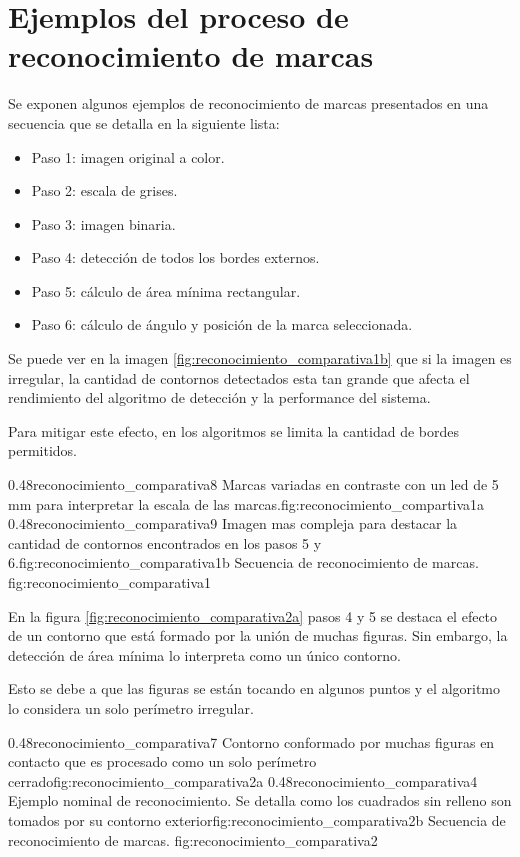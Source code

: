 
\chapter{Ejemplos del proceso de reconocimiento de marcas} %
\label{AppendixA} %

         Se exponen algunos ejemplos de reconocimiento de marcas presentados en una secuencia que se detalla en la siguiente lista:
         \begin{itemize}
            \item{Paso 1: imagen original a color.}
            \item{Paso 2: escala de grises.}
            \item{Paso 3: imagen binaria.}
            \item{Paso 4: detección de todos los bordes externos.}
            \item{Paso 5: cálculo de área mínima rectangular.}
            \item{Paso 6: cálculo de ángulo y posición de la marca seleccionada.}
         \end{itemize}

         Se puede ver en la imagen \ref{fig:reconocimiento_comparativa1b} que si la imagen es irregular, la cantidad de contornos detectados esta tan grande que afecta el rendimiento del algoritmo de detección y la performance del sistema. \par
         Para mitigar este efecto, en los algoritmos se limita la cantidad de bordes permitidos.

\subfigab
         {0.48}{reconocimiento_comparativa8} {Marcas variadas en contraste con un led de 5 mm para interpretar la escala de las marcas.}{fig:reconocimiento_compartiva1a}
         {0.48}{reconocimiento_comparativa9} {Imagen mas compleja para destacar la cantidad de contornos encontrados en los pasos 5 y 6.}{fig:reconocimiento_comparativa1b}
         {Secuencia de reconocimiento de marcas.}
         {fig:reconocimiento_comparativa1}

         En la figura \ref{fig:reconocimiento_comparativa2a} pasos 4 y 5 se destaca el efecto de un contorno que está formado por la unión de muchas figuras. Sin embargo, la detección de área mínima lo interpreta como un único contorno.\par Esto se debe a que las figuras se están tocando en algunos puntos y el algoritmo lo considera un solo perímetro irregular.

\subfigab
         {0.48}{reconocimiento_comparativa7} {Contorno conformado por muchas figuras en contacto que es procesado como un solo perímetro cerrado}{fig:reconocimiento_comparativa2a}
         {0.48}{reconocimiento_comparativa4} {Ejemplo nominal de reconocimiento. Se detalla como los cuadrados sin relleno son tomados por su contorno exterior}{fig:reconocimiento_comparativa2b}
         {Secuencia de reconocimiento de marcas.}
         {fig:reconocimiento_comparativa2}




